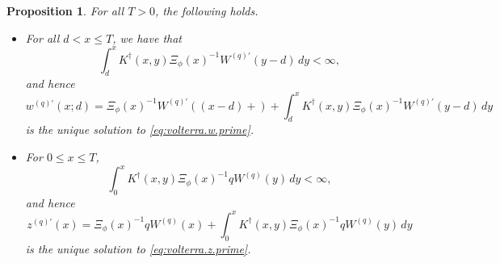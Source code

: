 \documentclass[12pt,reqno]{amsart}
\newcommand{\blue}{\textcolor[rgb]{0.00,0.00,1.00}}
\newcommand{\green}{\textcolor[rgb]{0.00,0.70,.30}}
\newtheorem{prop}[theorem]{Proposition}
\theoremstyle{definition}
\theoremstyle{remark}
\begin{document}
\begin{prop}\label{prop:solutions} 
For all $T>0$, the following holds. %
\begin{itemize}
\item[(i)] For all $d<x \leq T $,  we have that
 $$\int_d^xK^{\dagger}(x,y)\Xi_{\phi}(x)^{-1}W^{(q)\prime}(y-d)\,dy<\infty,$$ 
and hence 
\begin{equation}
\label{sf_explicit}
w^{(q)\prime}(x;d)=\Xi_{\phi}(x)^{-1}W^{(q)\prime}((x-d)+)+\int_d^x K^{\dagger}(x,y)\Xi_{\phi}(x)^{-1}W^{(q)\prime}(y-d)\,dy
\end{equation}
is the unique solution to \eqref{eq:volterra.w.prime}.
\item[(ii)] For $0 \leq x \leq T $, 
 $$\int_0^xK^{\dagger}(x,y)\Xi_{\phi}(x)^{-1}qW^{(q)}(y)\,dy<\infty,$$ 
 and hence 
\[
z^{(q)\prime}(x)= \Xi_{\phi}(x)^{-1} qW^{(q)}(x)+\int_0^x K^{\dagger}(x,y)\Xi_{\phi}(x)^{-1}qW^{(q)}(y)\,dy
\]
is the unique solution to \eqref{eq:volterra.z.prime}.
\end{itemize}
\end{prop}
\end{document}
